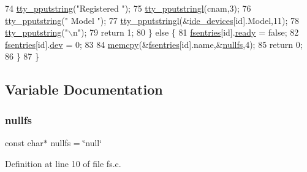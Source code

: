 \begin{DoxyCode}
74         \hyperlink{a00167_ade960b1320324706aac6c00cc6b1b2fe_ade960b1320324706aac6c00cc6b1b2fe}{tty\_pputstring}(\textcolor{stringliteral}{"Registered "});
75         \hyperlink{a00167_abaf93f9e56ddb7b10462070f59e534e4_abaf93f9e56ddb7b10462070f59e534e4}{tty\_pputstringl}(cnam,3);
76         \hyperlink{a00167_ade960b1320324706aac6c00cc6b1b2fe_ade960b1320324706aac6c00cc6b1b2fe}{tty\_pputstring}(\textcolor{stringliteral}{" Model "});
77         \hyperlink{a00167_abaf93f9e56ddb7b10462070f59e534e4_abaf93f9e56ddb7b10462070f59e534e4}{tty\_pputstringl}(&\hyperlink{a00035_ab97a828ed4839b575dc382e2bf826e87_ab97a828ed4839b575dc382e2bf826e87}{ide\_devices}[\textcolor{keywordtype}{id}].Model,11);
78         \hyperlink{a00167_ade960b1320324706aac6c00cc6b1b2fe_ade960b1320324706aac6c00cc6b1b2fe}{tty\_pputstring}(\textcolor{stringliteral}{"\(\backslash\)n"});
79         \textcolor{keywordflow}{return} 1;
80     \} \textcolor{keywordflow}{else} \{
81         \hyperlink{a00146_a6b46131164b26e476762930c9aae4319_a6b46131164b26e476762930c9aae4319}{fsentries}[id].\hyperlink{a00260_a284522ed97fe1eeebd0fcc039b2ea00a_a284522ed97fe1eeebd0fcc039b2ea00a}{ready} = \textcolor{keyword}{false};
82         \hyperlink{a00146_a6b46131164b26e476762930c9aae4319_a6b46131164b26e476762930c9aae4319}{fsentries}[id].\hyperlink{a00260_aaea66ea744fa50f1c54666033884d8d2_aaea66ea744fa50f1c54666033884d8d2}{dev} = 0;
83 
84         \hyperlink{a00125_a370712322c794e949c996946f2283ea8_a370712322c794e949c996946f2283ea8}{memcpy}(&\hyperlink{a00146_a6b46131164b26e476762930c9aae4319_a6b46131164b26e476762930c9aae4319}{fsentries}[\textcolor{keywordtype}{id}].name,&\hyperlink{a00143_a36265ac74fd925405e1179e799961f1e_a36265ac74fd925405e1179e799961f1e}{nullfs},4);
85         \textcolor{keywordflow}{return} 0;
86     \} 
87 \}
\end{DoxyCode}


\subsection{Variable Documentation}
\mbox{\label{a00143_a36265ac74fd925405e1179e799961f1e_a36265ac74fd925405e1179e799961f1e}} 
\subsubsection{\texorpdfstring{nullfs}{nullfs}}
{\footnotesize\ttfamily const char$\ast$ nullfs = \char`\"{}null\char`\"{}}



Definition at line 10 of file fs.\+c.

